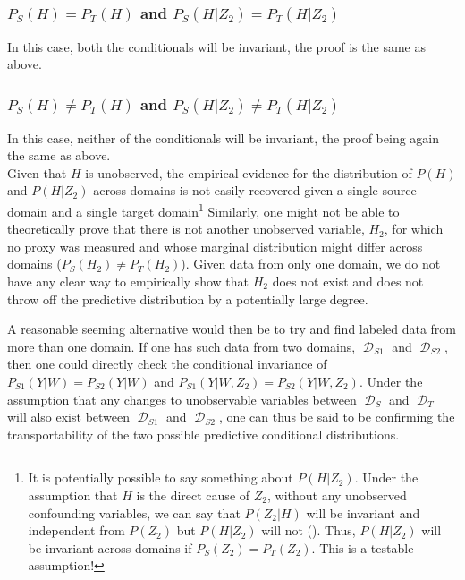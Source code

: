 \documentclass[a4paper,12pt]{article}
\DeclareMathOperator*{\D}{\mathcal{D}}
\begin{document}
\subsubsection*{$P_S(H) = P_T(H)$ and $P_S(H|Z_2) = P_T(H|Z_2)$}

In this case, both the conditionals will be invariant, the proof is the same as above.

\subsubsection*{$P_S(H) \neq P_T(H)$ and $P_S(H|Z_2) \neq P_T(H|Z_2)$}

In this case, neither of the conditionals will be invariant, the proof being again the same as above.
\mbox{}
\\


Given that $H$ is unobserved, the empirical evidence for the distribution of $P(H)$ and $P(H|Z_2)$ across domains is not easily recovered given a single source domain and a single target domain\footnote{It is potentially possible to say something about $P(H|Z_2)$. Under the assumption that $H$ is the direct cause of $Z_2$, without any unobserved confounding variables, we can say that $P(Z_2|H)$ will be invariant and independent from $P(Z_2)$ but $P(H|Z_2)$ will not (\cite[see][for an exposition of this feature which is closely related to weak exogoneity]{Daniusis2010, Sch2012, Peters2017}). Thus, $P(H|Z_2)$ will be invariant across domains if $P_S(Z_2) = P_T(Z_2)$. This is a testable assumption! } Similarly, one might not be able to theoretically prove that there is not another unobserved variable, $H_2$, for which no proxy was measured and whose marginal distribution might differ across domains ($P_S(H_2) \neq P_T(H_2)$). Given data from only one domain, we do not have any clear way to empirically show that $H_2$ does not exist and does not throw off the predictive distribution by a potentially large degree.

A reasonable seeming alternative would then be to try and find labeled data from more than one domain. If one has such data from two domains, $\D_{S1}$ and $\D_{S2}$, then one could directly check the conditional invariance of $P_{S1}(Y|W) = P_{S2}(Y|W)$ and $P_{S1}(Y|W,Z_2) = P_{S2}(Y|W,Z_2)$. Under the assumption that any changes to unobservable variables between $\D_S$  and $\D_T$ will also exist between $\D_{S1}$ and $\D_{S2}$, one can thus be said to be confirming the transportability of the two possible predictive conditional distributions.
\end{document}
